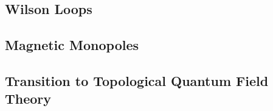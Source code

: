 
\subsection{Wilson Loops}


\subsection{Magnetic Monopoles}


\subsection{Transition to Topological Quantum Field Theory}

